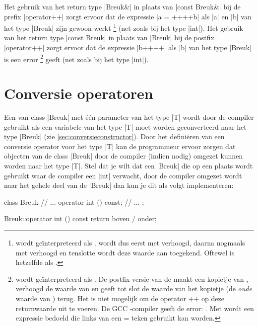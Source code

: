 \begin{cpplstShortInline}
Het gebruik van het return type |Breuk&| in plaats van |const Breuk&| bij de prefix |operator++| zorgt ervoor dat de expressie |a = ++++b| als |a| en |b| van het type |Breuk| zijn gewoon werkt%
\footnote{%
	 wordt geïnterpreteerd als .  wordt dus eerst met  verhoogd, daarna nogmaals met  verhoogd en tenslotte wordt deze waarde aan  toegekend. Oftewel  is hetzelfde als .
} (net zoals bij het type |int|). 
Het gebruik van het return type |const Breuk| in plaats van |Breuk| bij de postfix |operator++| zorgt ervoor dat de expressie |b++++| als |b| van het type |Breuk| is een error%
\footnote{%
	 wordt geïnterpreteerd als . De postfix versie van de  maakt een kopietje van , verhoogd de waarde van  en geeft tot slot de waarde van het kopietje (de \emph{oude} waarde van ) terug. Het is niet mogelijk om de operator ++ op deze returnwaarde uit te voeren. De GCC \Cpp{}\hyp{}compiler geeft de error: .
	Met  wordt een expressie bedoeld die links van een = teken gebruikt kan worden.
} geeft (net zoals bij het type |int|).

\section{Conversie operatoren}
\label{sec:conversionoperator}
Een  van class |Breuk| met één parameter van het type |T| wordt door de compiler gebruikt als een variabele van het type |T| moet worden geconverteerd naar het type |Breuk| (zie \cref{sec:conversieconstructor}).  
\label{type conversie}%
Door het definiëren van een conversie operator voor het type |T| kan de programmeur ervoor zorgen dat objecten van de class |Breuk| door de compiler (indien nodig) omgezet kunnen worden naar het type |T|.
Stel dat je wilt dat een |Breuk| die op een plaats wordt gebruikt waar de compiler een |int| verwacht, door de compiler omgezet wordt naar het gehele deel van de |Breuk| dan kun je dit als volgt implementeren:

\begin{cpplstfragment}
	class Breuk {
		// ...
		operator int () const;
		// ...
	};
	
	Breuk::operator int () const {
		return boven / onder;
	}
\end{cpplstfragment}


\end{cpplstShortInline}
